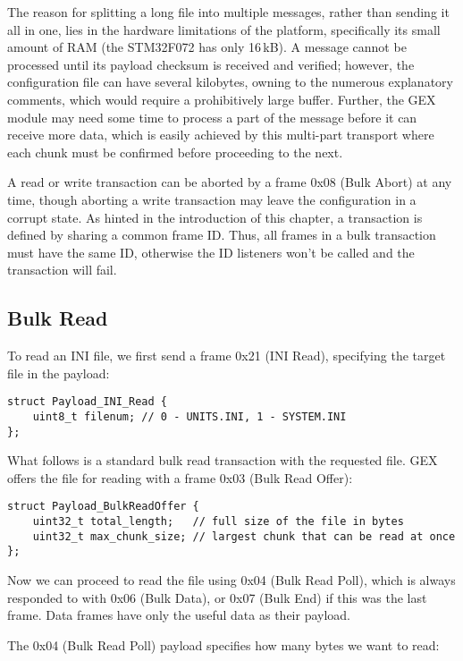 The reason for splitting a long file into multiple messages, rather than sending it all in one, lies in the hardware limitations of the platform, specifically its small amount of RAM (the STM32F072 has only 16\,kB). A message cannot be processed until its payload checksum is received and verified; however, the configuration file can have several kilobytes, owning to the numerous explanatory comments, which would require a prohibitively large buffer. Further, the GEX module may need some time to process a part of the message before it can receive more data, which is easily achieved by this multi-part transport where each chunk must be confirmed before proceeding to the next.

A read or write transaction can be aborted by a frame 0x08 (Bulk Abort) at any time, though aborting a write transaction may leave the configuration in a corrupt state. As hinted in the introduction of this chapter, a transaction is defined by sharing a common frame ID. Thus, all frames in a bulk transaction must have the same ID, otherwise the ID listeners won't be called and the transaction will fail.

\subsection{Bulk Read}

To read an INI file, we first send a frame 0x21 (INI Read), specifying the target file in the payload:

\begin{verbatim}
struct Payload_INI_Read {
    uint8_t filenum; // 0 - UNITS.INI, 1 - SYSTEM.INI
};
\end{verbatim}

What follows is a standard bulk read transaction with the requested file.
GEX offers the file for reading with a frame 0x03 (Bulk Read Offer):

\begin{verbatim}
struct Payload_BulkReadOffer {
    uint32_t total_length;   // full size of the file in bytes
    uint32_t max_chunk_size; // largest chunk that can be read at once
};
\end{verbatim}

Now we can proceed to read the file using 0x04 (Bulk Read Poll), which is always responded to with 0x06 (Bulk Data), or 0x07 (Bulk End) if this was the last frame. Data frames have only the useful data as their payload.

The 0x04 (Bulk Read Poll) payload specifies how many bytes we want to read:

